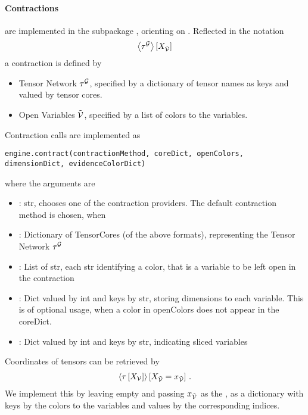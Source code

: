 \paragraph{Contractions} are implemented in the subpackage \spengine{}, orienting on .
Reflected in the notation
\begin{align*}
    \left\langle \tau^{\mathcal{G}}\right\rangle \left[ X_{\tilde{\mathcal{V}}} \right]
\end{align*}
a contraction is defined by
\begin{itemize}
    \item Tensor Network $\tau^{\mathcal{G}}$, specified by a dictionary of tensor names as keys and valued by tensor cores.
    \item Open Variables $\tilde{\mathcal{V}}$, specified by a list of colors to the variables.
\end{itemize}
Contraction calls are implemented as
\begin{lstlisting}
engine.contract(contractionMethod, coreDict, openColors, dimensionDict, evidenceColorDict)
\end{lstlisting}
where the arguments are
\begin{itemize}
    \item {}: str, chooses one of the contraction providers. The default contraction method  is chosen, when
    \item {}: Dictionary of TensorCores (of the above formats), representing the Tensor Network $\tau^{\mathcal{G}}$
    \item {}: List of str, each str identifying a color, that is a variable to be left open in the contraction
    \item {}: Dict valued by int and keys by str, storing dimensions to each variable. This is of optional usage, when a color in openColors does not appear in the coreDict.
    \item {}: Dict valued by int and keys by str, indicating sliced variables
\end{itemize}

Coordinates of tensors can be retrieved by
\begin{align*}
    \left\langle \tau\left[X_{\mathcal{V}}\right]\right\rangle \left[ X_{\tilde{\mathcal{V}}}=x_{\tilde{\mathcal{V}}} \right] \, .
\end{align*}
We implement this by leaving  empty and passing $x_{\tilde{\mathcal{V}}}$ as the , as a dictionary with keys by the  colors to the variables and values by the corresponding  indices.

